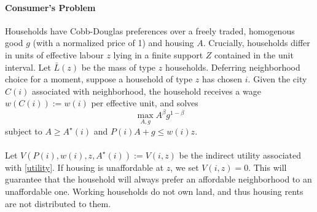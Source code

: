 \documentclass[]{article}
\begin{document}
\paragraph*{Consumer's Problem}
Households have Cobb-Douglas preferences over a freely traded, homogenous good $g$ (with a normalized price of 1) and housing $A$. Crucially, households differ in units of effective labour $z$ lying in a finite support $Z$ contained in the unit interval. Let $\bar{L}(z)$ be the mass of type $z$ households. Deferring neighborhood choice for a moment, suppose a household of type $z$ has chosen $i$.  Given the city $C(i)$ associated with neighborhood, the household receives a wage $w(C(i)) := w(i)$ per effective unit, and solves 
\begin{equation}\label{utility}
	\max_{A, g} A^{\beta}g^{1-\beta}
\end{equation} 
subject to $A \geq A^{\star}(i)$ and $P(i)A + g \leq w(i)z$. \paragraph*{}
Let $V(P(i), w(i), z, A^{\star}(i)) := V(i, z)$ be the indirect utility associated with \eqref{utility}. If housing is unaffordable at $z$, we set $V(i, z) = 0$. This will guarantee that the household will always prefer an affordable neighborhood to an unaffordable one. Working households do not own land, and thus housing rents are not distributed to them.   
\end{document}
